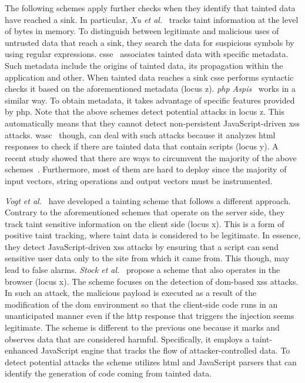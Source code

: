 \documentclass[conference]{IEEEtran}
\begin{document}
The following schemes apply further checks when
they identify that tainted data have reached a sink.
In particular, {\it Xu et al.}~\cite{XBS06}
tracks taint information at the level of bytes in memory.
To distinguish between legitimate and malicious uses
of untrusted data that reach a sink,
they search the data for suspicious symbols by using
regular expressions. {\sc csse}~\cite{PB05} associates
tainted data with specific metadata. Such metadata include
the origins of tainted data, its propagation within the application
and other. When tainted data reaches a sink {\sc csse} performs
syntactic checks it based on the aforementioned metadata
(locus {\sc z}). {\it {\sc php} Aspis}~\cite{PMP11} works
in a similar way. To obtain metadata, it takes advantage
of specific features provided by {\sc php}.
Note that the above schemes detect potential attacks
in locus {\sc z}. This automatically means that they
cannot detect non-persistent JavaScript-driven
{\sc xss} attacks. {\sc wasc}~\cite{NLC07} 
though, can deal with such attacks because it
analyzes {\sc html} responses to check
if there are tainted data that contain scripts (locus {\sc y}).
A recent study showed that there are ways to circumvent
the majority of the above schemes~\cite{NBR14}.
Furthermore, most of them are hard to deploy since
the majority of input vectors, string operations
and output vectors must be instrumented.

{\it Vogt et al.}~\cite{VFJKKV07}
have developed a tainting scheme that follows a different
approach. Contrary to the aforementioned schemes that
operate on the server side, they track taint sensitive
information on the client side (locus {\sc x}).
This is a form of positive taint tracking, where
taint data is considered to be legitimate.
In essence, they detect JavaScript-driven {\sc xss}
attacks by ensuring that a script can send sensitive
user data only to the site from which it came from.
This though, may lead to false alarms.
{\it Stock et al.}~\cite{SLMS14} propose a scheme
that also operates in the browser (locus {\sc x}).
The scheme focuses on the detection of
{\sc dom}-based {\sc xss} attacks.
In such an attack, the malicious payload is
executed as a result of the modification of the
{\sc dom} environment so that the client-side
code runs in an unanticipated manner even if the
{\sc http} response that triggers the injection seems legitimate.
The scheme is different to the previous one because it
marks and observes data that are considered harmful.
Specifically, it employs a taint-enhanced JavaScript
engine that tracks the flow of attacker-controlled data.
To detect potential attacks the scheme utilizes
{\sc html} and JavaScript parsers that can
identify the generation of code coming from
tainted data.
\end{document}
